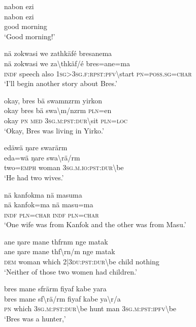 \ea\label{ex:8:a1652}
nabon ezi\\
\gll nabon	ezi\\
     good	morning\\
\glt `Good morning!'
\z

\ea\label{ex:8:a1653}
nä zokwasi we zathkäfé bresanema\\
\gll nä	zokwasi	we	za{\textbackslash}thkäf/é	bres=ane=ma\\
     \textsc{indf}	speech	also	1\textsc{sg}>3\textsc{sg}.\textsc{f}:\textsc{rpst}:\textsc{pfv}{\textbackslash}start	\textsc{pn}=\textsc{poss}.\textsc{sg}=\textsc{char}\\
\glt `I'll begin another story about Bres.'
\z

\ea\label{ex:8:a1655}
okay, bres bä swamnzrm yirkon\\
\gll okay	bres	bä	swa{\textbackslash}m/nzrm	\textsc{pln}=en\\
     okay	\textsc{pn}	\textsc{med}	3\textsc{sg}.\textsc{m}:\textsc{pst}:\textsc{dur}{\textbackslash}sit	\textsc{pln}=\textsc{loc}\\
\glt `Okay, Bres was living in Yirko.'
\z

\ea\label{ex:8:a1656}
edäwä ŋare swarärm\\
\gll eda=wä	ŋare	swa{\textbackslash}rä/rm\\
     two=\textsc{emph}	woman	3\textsc{sg}.\textsc{m}.\textsc{io}:\textsc{pst}:\textsc{dur}{\textbackslash}be\\
\glt `He had two wives.'
\z

\ea\label{ex:8:a1657}
nä kanfokma nä masuma\\
\gll nä	kanfok=ma	nä	masu=ma\\
     \textsc{indf}	\textsc{pln}=\textsc{char}	\textsc{indf}	\textsc{pln}=\textsc{char}\\
\glt `One wife was from Kanfok and the other was from Masu.'
\z

\ea\label{ex:8:a1658}
ane ŋare mane thfrnm nge matak\\
\gll ane	ŋare	mane	thf{\textbackslash}rn/m	nge	matak\\
     \textsc{dem}	woman	which	2|3\textsc{du}:\textsc{pst}:\textsc{dur}{\textbackslash}be	child	nothing\\
\glt `Neither of those two women had children.'
\z

\ea\label{ex:8:a1659}
bres mane sfrärm fiyaf kabe yara\\
\gll bres	mane	sf{\textbackslash}rä/rm	fiyaf	kabe	ya{\textbackslash}r/a\\
     \textsc{pn}	which	3\textsc{sg}.\textsc{m}:\textsc{pst}:\textsc{dur}{\textbackslash}be	hunt	man	3\textsc{sg}.\textsc{m}:\textsc{pst}:\textsc{ipfv}{\textbackslash}be\\
\glt `Bres was a hunter,'
\z

